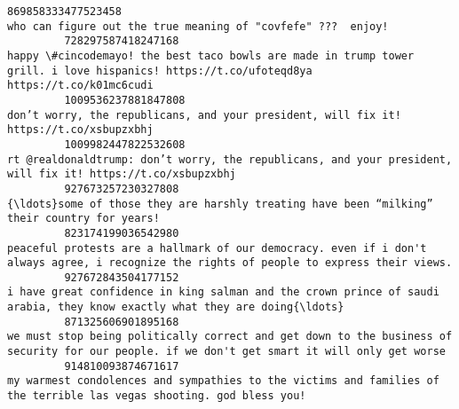 \documentclass[11pt]{article}
\begin{document}
\begin{Verbatim}[commandchars=\\\{\}]
         869858333477523458                                                                                                                                                                                                                              who can figure out the true meaning of "covfefe" ???  enjoy!   
         728297587418247168                                                                                                                                                  happy \#cincodemayo! the best taco bowls are made in trump tower grill. i love hispanics! https://t.co/ufoteqd8ya https://t.co/k01mc6cudi   
         1009536237881847808                                                                                                                                                                                                   don’t worry, the republicans, and your president, will fix it! https://t.co/xsbupzxbhj   
         1009982447822532608                                                                                                                                                                              rt @realdonaldtrump: don’t worry, the republicans, and your president, will fix it! https://t.co/xsbupzxbhj   
         927673257230327808                                                                                                                                                                                                  {\ldots}some of those they are harshly treating have been “milking” their country for years!   
         823174199036542980                                                                                                                                                 peaceful protests are a hallmark of our democracy. even if i don't always agree, i recognize the rights of people to express their views.   
         927672843504177152                                                                                                                                                                    i have great confidence in king salman and the crown prince of saudi arabia, they know exactly what they are doing{\ldots}   
         871325606901895168                                                                                                                                              we must stop being politically correct and get down to the business of security for our people. if we don't get smart it will only get worse   
         914810093874671617                                                                                                                                                                      my warmest condolences and sympathies to the victims and families of the terrible las vegas shooting. god bless you!   

\end{Verbatim}
\end{document}
